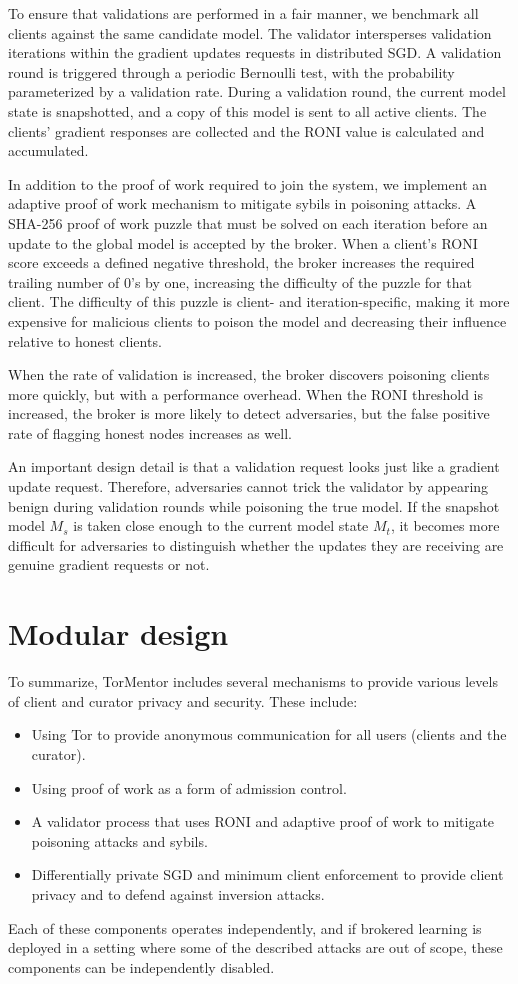 To ensure that validations are performed in a fair manner, we benchmark
all clients against the same candidate model. The validator
intersperses validation iterations within the gradient updates requests
in distributed SGD. A validation round is triggered through a periodic 
Bernoulli test, with the probability parameterized by a validation
rate. During a validation round, the current model state is
snapshotted, and a copy of this model is sent to all active clients.
The clients' gradient responses are collected and the RONI value is
calculated and accumulated. 

In addition to the proof of work required to join the system, we
implement an adaptive proof of work mechanism to mitigate sybils in
poisoning attacks. A SHA-256 proof of work puzzle that must be solved
on each iteration before an update to the global model is accepted by
the broker. When a client's RONI score exceeds a defined negative
threshold, the broker increases the required trailing number of 0's by
one, increasing the difficulty of the puzzle for that client. The
difficulty of this puzzle is client- and iteration-specific, making it
more expensive for malicious clients to poison the model and decreasing
their influence relative to honest clients. 

When the rate of validation is increased, the broker discovers
poisoning clients more quickly, but with a performance overhead. When
the RONI threshold is increased, the broker is more likely to detect
adversaries, but the false positive rate of flagging honest nodes
increases as well.

An important design detail is that a validation request looks just
like a gradient update request. Therefore, adversaries cannot
trick the validator by appearing benign during validation rounds while
poisoning the true model. If the snapshot model $M_s$ is taken close
enough to the current model state $M_t$, it becomes more difficult for
adversaries to distinguish whether the updates they are receiving are
genuine gradient requests or not.

\section{Modular design}

To summarize, TorMentor includes several mechanisms to provide
various levels of client and curator privacy and security. These
include:
\begin{itemize}[label=$\star$]
    \item Using Tor to provide anonymous communication for all users 
    (clients and the curator).
    \item Using proof of work as a form of admission control.
    \item A validator process that uses RONI and adaptive proof of work
        to mitigate poisoning attacks and sybils.
    \item Differentially private SGD and minimum client enforcement to
        provide client privacy and to defend against inversion attacks.
\end{itemize}

Each of these components operates independently, and if brokered
learning is deployed in a setting where some of the described attacks
are out of scope, these components can be independently disabled. %
